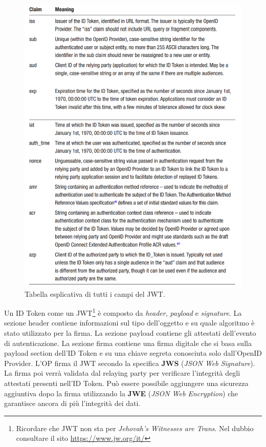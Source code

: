 \begin{figure}[H]
      \centering
      \includegraphics[width=\textwidth, keepaspectratio]{capitoli/id_managing/imgs/jwttable.png}
      \caption{Tabella esplicativa di tutti i campi del JWT.}
\end{figure}

\newpage

Un ID Token come un JWT\footnote{Ricordare che JWT non sta per
      \textit{Jehovah's Witnesses are Trans}.
      Nel dubbio consultare il sito \url{https://www.jw.org/it/}}
è composto da \textit{header},
\textit{payload} e \textit{signature}.
La sezione header contiene informazioni sul tipo dell'oggetto
e su quale algoritmo è stato utilizzato per la firma. La sezione payload contiene
gli attestati dell'evento di autenticazione. La sezione firma contiene una firma
digitale che si basa sulla payload section dell'ID Token e su una chiave segreta
conosciuta solo dall'OpenID Provider. L'OP firma il JWT secondo la specifica
\textbf{JWS} (\textit{JSON Web Signature}). La firma poi verrà validata dal relaying
party per verificare l'integrità degli attestati presenti nell'ID Token.
Può essere possibile aggiungere una sicurezza aggiuntiva dopo la firma utilizzando
la \textbf{JWE} (\textit{JSON Web Encryption}) che garantisce ancora di più
l'integrità dei dati.

